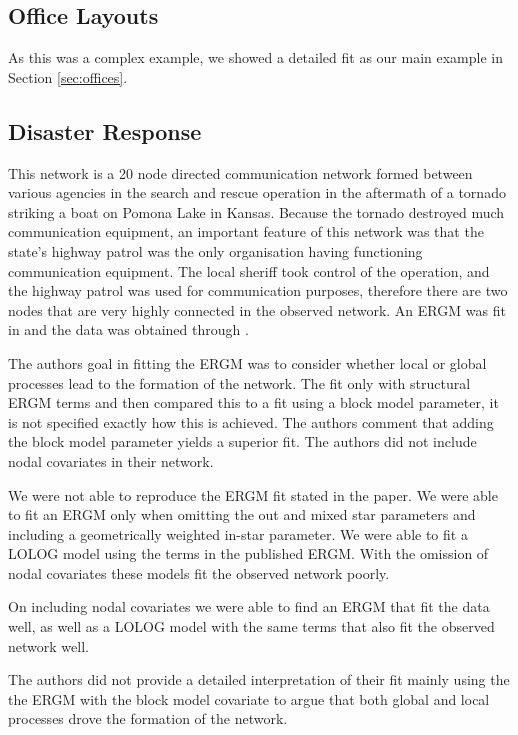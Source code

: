 \documentclass[
]{statsoc}
\begin{document}
\subsection{Office Layouts}

As this was a complex example, we showed a detailed fit as our main
example in Section \ref{sec:offices}.

\subsection{Disaster Response}

This network is a 20 node directed communication network formed between
various agencies in the search and rescue operation in the aftermath of
a tornado striking a boat on Pomona Lake in Kansas. Because the tornado
destroyed much communication equipment, an important feature of this
network was that the state's highway patrol was the only organisation
having functioning communication equipment. The local sheriff took
control of the operation, and the highway patrol was used for
communication purposes, therefore there are two nodes that are very
highly connected in the observed network. An ERGM was fit in
\cite{Doreian2012} and the data was obtained through
\cite{DisasterData}.

The authors goal in fitting the ERGM was to consider whether local or
global processes lead to the formation of the network. The fit only with
structural ERGM terms and then compared this to a fit using a block
model parameter, it is not specified exactly how this is achieved. The
authors comment that adding the block model parameter yields a superior
fit. The authors did not include nodal covariates in their network.

We were not able to reproduce the ERGM fit stated in the paper. We were
able to fit an ERGM only when omitting the out and mixed star parameters
and including a geometrically weighted in-star parameter. We were able
to fit a LOLOG model using the terms in the published ERGM. With the
omission of nodal covariates these models fit the observed network
poorly.

On including nodal covariates we were able to find an ERGM that fit the
data well, as well as a LOLOG model with the same terms that also fit
the observed network well.

The authors did not provide a detailed interpretation of their fit
mainly using the the ERGM with the block model covariate to argue that
both global and local processes drove the formation of the network.
\end{document}
